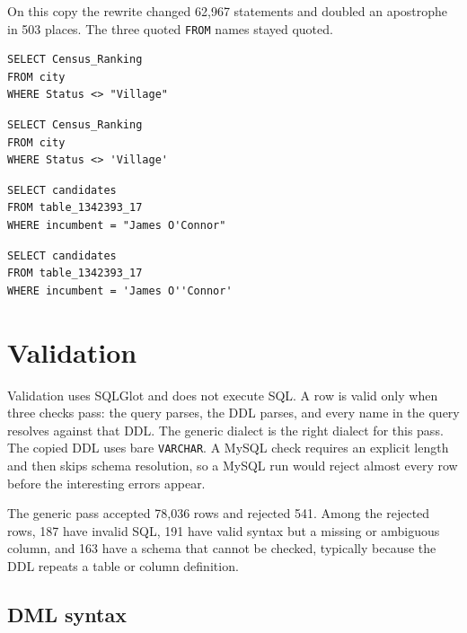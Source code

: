 \documentclass[11pt,a4paper]{article}
\begin{document}
On this copy the rewrite changed 62{,}967 statements and doubled an apostrophe
in 503 places. The three quoted \texttt{FROM} names stayed quoted.

\begin{lstlisting}[caption={Before: a double-quoted literal is an identifier in the generic dialect.}]
SELECT Census_Ranking
FROM city
WHERE Status <> "Village"
\end{lstlisting}

\begin{lstlisting}[caption={After: the same predicate, with a single-quoted string.}]
SELECT Census_Ranking
FROM city
WHERE Status <> 'Village'
\end{lstlisting}

\begin{lstlisting}[caption={Before: an apostrophe inside a double-quoted literal.}]
SELECT candidates
FROM table_1342393_17
WHERE incumbent = "James O'Connor"
\end{lstlisting}

\begin{lstlisting}[caption={After: the apostrophe is doubled inside a single-quoted literal.}]
SELECT candidates
FROM table_1342393_17
WHERE incumbent = 'James O''Connor'
\end{lstlisting}

\section{Validation}

Validation uses SQLGlot and does not execute SQL. A row is valid only when
three checks pass: the query parses, the DDL parses, and every name in the
query resolves against that DDL. The generic dialect is the right dialect for
this pass. The copied DDL uses bare \texttt{VARCHAR}. A MySQL check requires
an explicit length and then skips schema resolution, so a MySQL run would
reject almost every row before the interesting errors appear.

The generic pass accepted 78{,}036 rows and rejected 541. Among the rejected
rows, 187 have invalid SQL, 191 have valid syntax but a missing or ambiguous
column, and 163 have a schema that cannot be checked, typically because the
DDL repeats a table or column definition.

\subsection{DML syntax}
\end{document}

